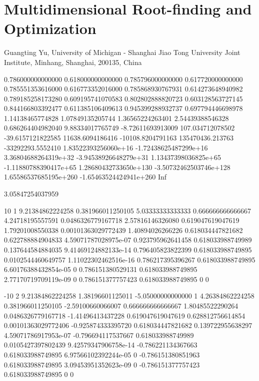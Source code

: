 \chapter{Multidimensional Root-finding and Optimization}
\begin{center}
Guangting Yu, University of Michigan - Shanghai Jiao Tong University Joint Institute, Minhang, Shanghai, 200135, China
\end{center}


0.786000000000000		0.618000000000000
0.785796000000000		0.617720000000000
0.785551353616000		0.616773352016000
0.785868930767931		0.614273648940982
0.789185258173280		0.609195741070583
0.802802888820723		0.603128563727145
0.844166803392477		0.611385106409613
0.945399288932737		0.697794446698978
1.14138465774828		1.07849135205744
1.36565224263401		2.54439388546328
0.686264404982040		9.88334017765749
-8.72611693913009		107.034712078502
-39.6157121822585		11638.6094186416
-10108.8204791163		135470436.213763
-33292293.5552410		1.83522393256060e+16
-1.72438625487299e+16	3.36804688264319e+32
-3.94538926648279e+31	1.13437398036825e+65
-1.11880788390417e+65	1.28680432733650e+130
-3.50732462503746e+128	1.65586537685195e+260
-1.65463524424941e+260	Inf


3.05847254037959




10					1					9.21384862224258		0.381966011250105
5.03333333333333	0.666666666666667	4.24718195557591		0.0486326779167718
2.57816146326080	0.619047619047619	1.79201008550338		0.00101363029772439
1.40894026266226	0.618034447821682	0.622788884904833		4.59071787028975e-07
0.923795962641458	0.618033988749989	0.137644584884035		9.41469124882133e-14
0.796405823822399	0.618033988749895	0.0102544460649757		1.11022302462516e-16
0.786217395396267	0.618033988749895	6.60176388432854e-05	0
0.786151380529131	0.618033988749895	2.77170719709119e-09	0
0.786151377757423	0.618033988749895	0						0

-10					2					9.21384862224258		1.38196601125011
-5.05000000000000	1					4.26384862224258		0.381966011250105
-2.59100660066007	0.666666666666667	1.80485522290264		0.0486326779167718
-1.41496413437228	0.619047619047619	0.628812756614854		0.00101363029772406
-0.925874333395720	0.618034447821682	0.139722955638297		4.59071786917953e-07
-0.796694117537667	0.618033988749989	0.0105427397802439		9.42579347906758e-14
-0.786221134367663	0.618033988749895	6.97566102392244e-05	0
-0.786151380851963	0.618033988749895	3.09453951352623e-09	0
-0.786151377757423	0.618033988749895	0						0


